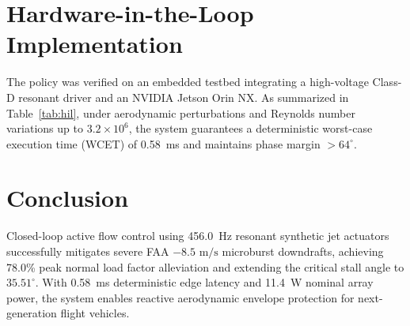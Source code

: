 \documentclass[journal,10pt,twocolumn]{IEEEtran}
\begin{document}
\begin{table}[h]
\caption{Dynamic Stall Envelope Extension and Pitch Damping Comparison}
\label{tab:stall_ext}
\centering
\footnotesize
{}
\end{table}

\section{Hardware-in-the-Loop Implementation}
The policy was verified on an embedded testbed integrating a high-voltage Class-D resonant driver and an NVIDIA Jetson Orin NX. As summarized in Table~\ref{tab:hil}, under aerodynamic perturbations and Reynolds number variations up to $3.2 \times 10^6$, the system guarantees a deterministic worst-case execution time (WCET) of 0.58~ms and maintains phase margin $>64^\circ$.

\begin{table}[h]
\caption{Hardware-in-the-Loop Robustness and Execution Profiling}
\label{tab:hil}
\centering
\footnotesize
{}
\end{table}

\section{Conclusion}
Closed-loop active flow control using 456.0~Hz resonant synthetic jet actuators successfully mitigates severe FAA $-8.5\text{ m/s}$ microburst downdrafts, achieving 78.0\% peak normal load factor alleviation and extending the critical stall angle to $35.51^\circ$. With 0.58~ms deterministic edge latency and 11.4~W nominal array power, the system enables reactive aerodynamic envelope protection for next-generation flight vehicles.
\end{document}
